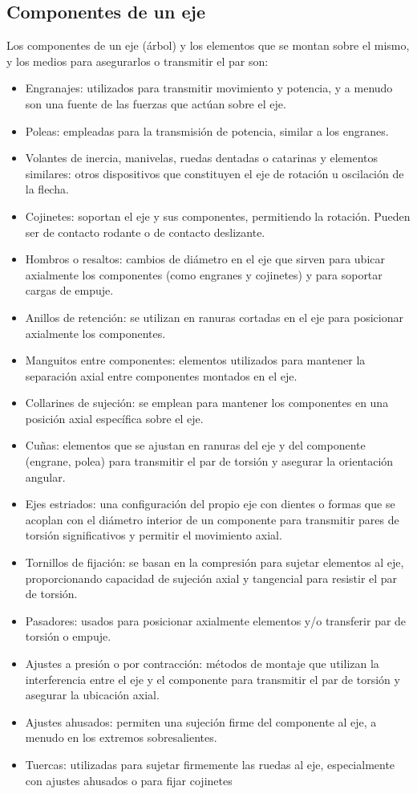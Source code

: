 \documentclass[spanish,11pt,a4paper]{article}
\begin{document}
	
	\subsection{Componentes de un eje}
	Los componentes de un eje (árbol) y los elementos que se montan sobre el mismo, y los medios para asegurarlos o transmitir el par son:
	\begin{itemize}
	\item Engranajes: utilizados para transmitir movimiento y potencia, y a menudo son una fuente de las fuerzas que actúan sobre el eje.
	\item Poleas: empleadas para la transmisión de potencia, similar a los engranes.
	\item Volantes de inercia, manivelas, ruedas dentadas o catarinas y elementos similares: otros dispositivos que constituyen el eje de rotación u oscilación de la flecha.
	\item Cojinetes: soportan el eje y sus componentes, permitiendo la rotación. Pueden ser de contacto rodante o de contacto deslizante.
	\item Hombros o resaltos: cambios de diámetro en el eje que sirven para ubicar axialmente los componentes (como engranes y cojinetes) y para soportar cargas de empuje.
	\item Anillos de retención: se utilizan en ranuras cortadas en el eje para posicionar axialmente los componentes.
	\item Manguitos entre componentes: elementos utilizados para mantener la separación axial entre componentes montados en el eje.
	\item Collarines de sujeción: se emplean para mantener los componentes en una posición axial específica sobre el eje.
	\item Cuñas: elementos que se ajustan en ranuras del eje y del componente (engrane, polea) para transmitir el par de torsión y asegurar la orientación angular.
	\item Ejes estriados: una configuración del propio eje con dientes o formas que se acoplan con el diámetro interior de un componente para transmitir pares de torsión significativos y permitir el movimiento axial.
	\item Tornillos de fijación: se basan en la compresión para sujetar elementos al eje, proporcionando capacidad de sujeción axial y tangencial para resistir el par de torsión.
	\item Pasadores: usados para posicionar axialmente elementos y/o transferir par de torsión o empuje.
	\item Ajustes a presión o por contracción: métodos de montaje que utilizan la interferencia entre el eje y el componente para transmitir el par de torsión y asegurar la ubicación axial.
	\item Ajustes ahusados: permiten una sujeción firme del componente al eje, a menudo en los extremos sobresalientes.
	\item Tuercas: utilizadas para sujetar firmemente las ruedas al eje, especialmente con ajustes ahusados o para fijar cojinetes
	\end{itemize}
	
\end{document}
